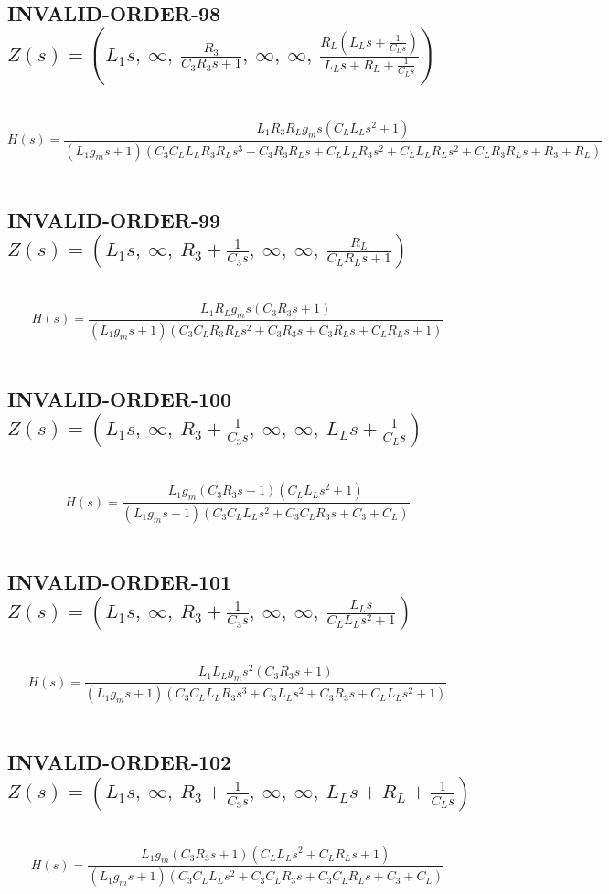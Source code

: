 \documentclass{article}
\begin{document}
\subsection{INVALID-ORDER-98 $Z(s) = \left( L_{1} s, \  \infty, \  \frac{R_{3}}{C_{3} R_{3} s + 1}, \  \infty, \  \infty, \  \frac{R_{L} \left(L_{L} s + \frac{1}{C_{L} s}\right)}{L_{L} s + R_{L} + \frac{1}{C_{L} s}}\right)$ } \ 
\textbf{\[H(s) = \frac{L_{1} R_{3} R_{L} g_{m} s \left(C_{L} L_{L} s^{2} + 1\right)}{\left(L_{1} g_{m} s + 1\right) \left(C_{3} C_{L} L_{L} R_{3} R_{L} s^{3} + C_{3} R_{3} R_{L} s + C_{L} L_{L} R_{3} s^{2} + C_{L} L_{L} R_{L} s^{2} + C_{L} R_{3} R_{L} s + R_{3} + R_{L}\right)}\] } \ 
\subsection{INVALID-ORDER-99 $Z(s) = \left( L_{1} s, \  \infty, \  R_{3} + \frac{1}{C_{3} s}, \  \infty, \  \infty, \  \frac{R_{L}}{C_{L} R_{L} s + 1}\right)$ } \ 
\textbf{\[H(s) = \frac{L_{1} R_{L} g_{m} s \left(C_{3} R_{3} s + 1\right)}{\left(L_{1} g_{m} s + 1\right) \left(C_{3} C_{L} R_{3} R_{L} s^{2} + C_{3} R_{3} s + C_{3} R_{L} s + C_{L} R_{L} s + 1\right)}\] } \ 
\subsection{INVALID-ORDER-100 $Z(s) = \left( L_{1} s, \  \infty, \  R_{3} + \frac{1}{C_{3} s}, \  \infty, \  \infty, \  L_{L} s + \frac{1}{C_{L} s}\right)$ } \ 
\textbf{\[H(s) = \frac{L_{1} g_{m} \left(C_{3} R_{3} s + 1\right) \left(C_{L} L_{L} s^{2} + 1\right)}{\left(L_{1} g_{m} s + 1\right) \left(C_{3} C_{L} L_{L} s^{2} + C_{3} C_{L} R_{3} s + C_{3} + C_{L}\right)}\] } \ 
\subsection{INVALID-ORDER-101 $Z(s) = \left( L_{1} s, \  \infty, \  R_{3} + \frac{1}{C_{3} s}, \  \infty, \  \infty, \  \frac{L_{L} s}{C_{L} L_{L} s^{2} + 1}\right)$ } \ 
\textbf{\[H(s) = \frac{L_{1} L_{L} g_{m} s^{2} \left(C_{3} R_{3} s + 1\right)}{\left(L_{1} g_{m} s + 1\right) \left(C_{3} C_{L} L_{L} R_{3} s^{3} + C_{3} L_{L} s^{2} + C_{3} R_{3} s + C_{L} L_{L} s^{2} + 1\right)}\] } \ 
\subsection{INVALID-ORDER-102 $Z(s) = \left( L_{1} s, \  \infty, \  R_{3} + \frac{1}{C_{3} s}, \  \infty, \  \infty, \  L_{L} s + R_{L} + \frac{1}{C_{L} s}\right)$ } \ 
\textbf{\[H(s) = \frac{L_{1} g_{m} \left(C_{3} R_{3} s + 1\right) \left(C_{L} L_{L} s^{2} + C_{L} R_{L} s + 1\right)}{\left(L_{1} g_{m} s + 1\right) \left(C_{3} C_{L} L_{L} s^{2} + C_{3} C_{L} R_{3} s + C_{3} C_{L} R_{L} s + C_{3} + C_{L}\right)}\] } \ 
\end{document}
